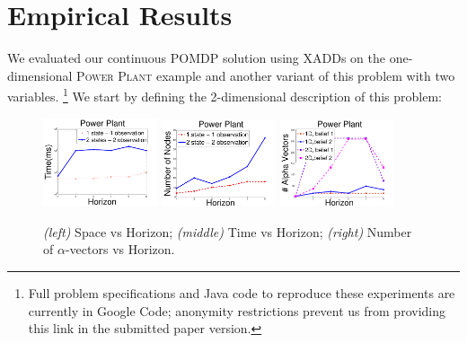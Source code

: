 \documentclass{article} %
\begin{document}
\section{Empirical Results}
We evaluated our continuous POMDP solution using XADDs on the one-dimensional
\textsc{Power Plant} example and another variant of this problem with two variables. \footnote{
Full problem specifications and Java code to reproduce these experiments are currently 
in Google Code; anonymity restrictions prevent us from providing this link in the submitted paper version.}
We start by defining the 2-dimensional description of this problem:
\begin{figure}[tbp!]
\vspace{-2mm}
\centering
\includegraphics[width=0.3\textwidth]{pics/time2.pdf}
\includegraphics[width=0.3\textwidth]{pics/nodes2.pdf}
\includegraphics[width=0.3\textwidth]{pics/alpha-vectors2.pdf}
\vspace{-3mm}
\caption{\footnotesize 
{\it (left)} Space vs Horizon; 
{\it (middle)} Time vs Horizon; 
{\it (right)} Number of $\alpha$-vectors vs Horizon.
}
\label{fig:timeSpace}
\vspace{-4mm}
\end{figure}
\end{document}

